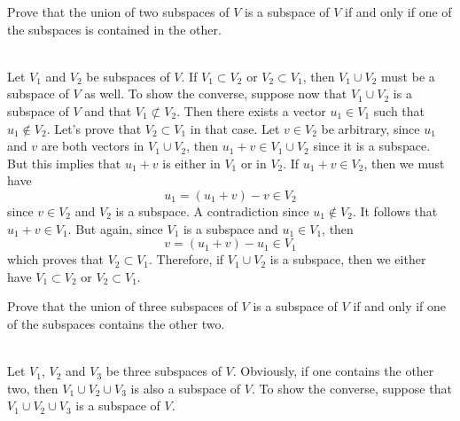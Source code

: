 \begin{exercise}
    Prove that the union of two subspaces of $V$ is a subspace of $V$ if and only if one of the subspaces is contained in the other. \\
\end{exercise}

\begin{solution}
    \\ Let $V_1$ and $V_2$ be subspaces of $V$. If $V_1 \subset V_2$ or $V_2 \subset V_1$, then $V_1 \cup V_2$ must be a subspace of $V$ as well. To show the converse, suppose now that $V_1 \cup V_2$ is a subspace of $V$ and that $V_1 \not\subset V_2$. Then there exists a vector $u_1 \in V_1$ such that $u_1 \notin V_2$. Let's prove that $V_2 \subset V_1$ in that case. Let $v \in V_2$ be arbitrary, since $u_1$ and $v$ are both vectors in $V_1 \cup V_2$, then $u_1 + v \in V_1 \cup V_2$ since it is a subspace. But this implies that $u_1 + v$ is either in $V_1$ or in $V_2$. If $u_1 + v \in V_2$, then we must have
    $$u_1 = (u_1 + v) - v \in V_2$$
    since $v \in V_2$ and $V_2$ is a subspace. A contradiction since $u_1 \notin V_2$. It follows that $u_1 + v \in V_1$. But again, since $V_1$ is a subspace and $u_1 \in V_1$, then
    $$v = (u_1 + v) - u_1 \in V_1$$
    which proves that $V_2 \subset V_1$. Therefore, if $V_1 \cup V_2$ is a subspace, then we either have $V_1 \subset V_2$ or $V_2 \subset V_1$. \\
\end{solution}

\begin{exercise}
    Prove that the union of three subspaces of $V$ is a subspace of $V$ if and only if one of the subspaces contains the other two. \\
\end{exercise}

\begin{solution}
    \\ Let $V_1$, $V_2$ and $V_3$ be three subspaces of $V$. Obviously, if one contains the other two, then $V_1 \cup V_2 \cup V_3$ is also a subspace of $V$. To show the converse, suppose that $V_1 \cup V_2 \cup V_3$ is a subspace of $V$.
\end{solution}